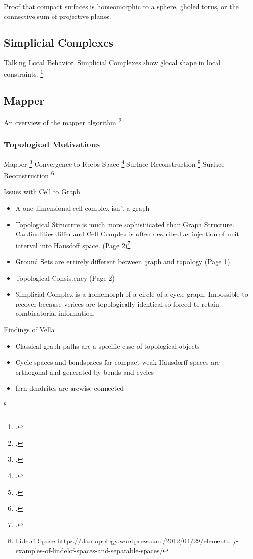 Proof that compact surfaces is homeomorphic to a sphere, gholed torus, or the connective sum of projective planes. 

\subsection{Simplicial Complexes}
Talking Local Behavior. Simplicial Complexes show glocal shape in local constraints. \footcite{Zomorodian2008}
\subsection{Mapper}
An overview of the mapper algorithm \footcite{Mapper}
\subsubsection{Topological Motivations}
Mapper \footcite{Mapper}
Convergence to Reebs Space \footcite{Wang2016}
Surface Reconstruction \footcite{Watson2010}
Surface Reconstruction \footcite{Kimia2008}

Issues with Cell to Graph
\begin{itemize} 
\item{A one dimensional cell complex isn't a graph}
\item{Topological Structure is much more sophisiticated than Graph Structure. Cardinalities differ and Cell Complex is often described as injection of unit interval into Hausdoff space. (Page 2)\footcite{Vella2015}}
\item {Ground Sets are entirely different between graph and topology  (Page 1)}
\item {Topological Consistency (Page 2)}
\item {Simplicial Complex is a homemorph of a circle of a cycle graph. Impossible to recover because verices are topologically identical so forced to retain combinatorial information.}
\end{itemize}
Findings of Vella
\begin{itemize}
\item{Classical graph paths are a specific case of topological objects}
\item{Cycle spaces and bondspaces for compact weak Hausdorff spaces are orthogonal and generated by bonds and cycles}
\item{fern dendrites are arcwise connected}
\end{itemize}

\footnote{Lideoff Space https://dantopology.wordpress.com/2012/04/29/elementary-examples-of-lindelof-spaces-and-separable-spaces/}


